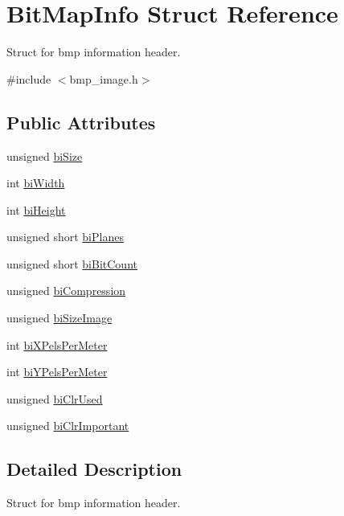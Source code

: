\hypertarget{structBitMapInfo}{}\section{Bit\+Map\+Info Struct Reference}
\label{structBitMapInfo}


Struct for bmp information header.  




{\ttfamily \#include $<$bmp\+\_\+image.\+h$>$}

\subsection*{Public Attributes}
\begin{DoxyCompactItemize}
\item 
unsigned \hyperlink{structBitMapInfo_a58417194f170d7733156cbcca49099e6}{bi\+Size}
\item 
int \hyperlink{structBitMapInfo_aa43e4572f40397137e4149503764d151}{bi\+Width}
\item 
int \hyperlink{structBitMapInfo_a5130bfb9c8a6b3ad1ba710965ef3e61e}{bi\+Height}
\item 
unsigned short \hyperlink{structBitMapInfo_a23dc89abcd16d62312b33e94d2c819b8}{bi\+Planes}
\item 
unsigned short \hyperlink{structBitMapInfo_a3f4084cb6c90d147211a6f72cd130ffc}{bi\+Bit\+Count}
\item 
unsigned \hyperlink{structBitMapInfo_aa9ba5846e707d9f5a864d074a4c08f1e}{bi\+Compression}
\item 
unsigned \hyperlink{structBitMapInfo_a6d98abd57de85a278eb3da36c13cbff4}{bi\+Size\+Image}
\item 
int \hyperlink{structBitMapInfo_ae9c2afcdcf52ddf9f5fdb843576a4581}{bi\+X\+Pels\+Per\+Meter}
\item 
int \hyperlink{structBitMapInfo_a669501761a51dc29cdee4367a7c24aed}{bi\+Y\+Pels\+Per\+Meter}
\item 
unsigned \hyperlink{structBitMapInfo_a720f71f528378c533bc3703206c09bcd}{bi\+Clr\+Used}
\item 
unsigned \hyperlink{structBitMapInfo_a36418d0dbc8269b1b72ddbd794c9487f}{bi\+Clr\+Important}
\end{DoxyCompactItemize}


\subsection{Detailed Description}
Struct for bmp information header. 

